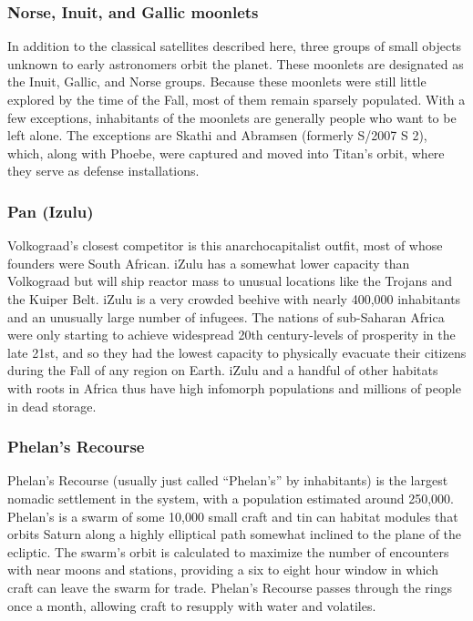 \subsubsection{Norse, Inuit, and Gallic moonlets} \label{sec:norse-inuit-gallic} 

In addition to the classical satellites described here, three groups of small objects unknown to early astronomers orbit the planet. These moonlets are designated as the Inuit, Gallic, and Norse groups. Because these moonlets were still little explored by the time of the Fall, most of them remain sparsely populated. With a few exceptions, inhabitants of the moonlets are generally people who want to be left alone. The exceptions are Skathi and Abramsen (formerly S/2007 S 2), which, along with Phoebe, were captured and moved into Titan's orbit, where they serve as defense installations. 

\subsubsection{Pan (Izulu)} \label{sec:pan-izulu} 

Volkograad's closest competitor is this anarchocapitalist outfit, most of whose founders were South African. iZulu has a somewhat lower capacity than Volkograad but will ship reactor mass to unusual locations like the Trojans and the Kuiper Belt. iZulu is a very crowded beehive with nearly 400,000 inhabitants and an unusually large number of infugees. The nations of sub-Saharan Africa were only starting to achieve widespread 20th century-levels of prosperity in the late 21st, and so they had the lowest capacity to physically evacuate their citizens during the Fall of any region on Earth. iZulu and a handful of other habitats with roots in Africa thus have high infomorph populations and millions of people in dead storage. 

\subsubsection{Phelan's Recourse} \label{sec:phelans-recourse} 

Phelan's Recourse (usually just called “Phelan's” by inhabitants) is the largest nomadic settlement in the system, with a population estimated around 250,000. Phelan's is a swarm of some 10,000 small craft and tin can habitat modules that orbits Saturn along a highly elliptical path somewhat inclined to the plane of the ecliptic. The swarm's orbit is calculated to maximize the number of encounters with near moons and stations, providing a six to eight hour window in which craft can leave the swarm for trade. Phelan's Recourse passes through the rings once a month, allowing craft to resupply with water and volatiles. 

